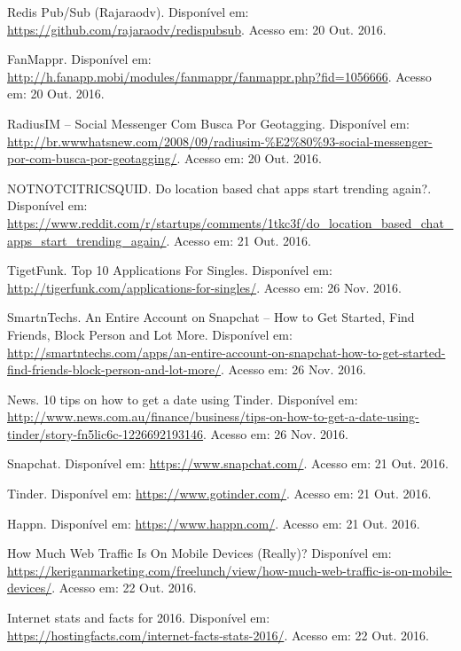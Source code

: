\documentclass[brazil,ruledheader]{abntifes}
\begin{document}
\begin{thebibliography}{9}
		Redis Pub/Sub (Rajaraodv). Disponível em: \url{https://github.com/rajaraodv/redispubsub}.
		Acesso em: 20 Out. 2016.
		
		FanMappr. Disponível em: \url{http://h.fanapp.mobi/modules/fanmappr/fanmappr.php?fid=1056666}.
		Acesso em: 20 Out. 2016.
		
		RadiusIM – Social Messenger Com Busca Por Geotagging. Disponível em: \url{http://br.wwwhatsnew.com/2008/09/radiusim-%E2%80%93-social-messenger-por-com-busca-por-geotagging/}.
			Acesso em: 20 Out. 2016.
			
		NOTNOTCITRICSQUID. Do location based chat apps start trending again?. Disponível em: \url{https://www.reddit.com/r/startups/comments/1tkc3f/do_location_based_chat_apps_start_trending_again/}.
		Acesso em: 21 Out. 2016.
		
		TigetFunk. Top 10 Applications For Singles. Disponível em: \url{http://tigerfunk.com/applications-for-singles/}.
		Acesso em: 26 Nov. 2016.
		
		SmartnTechs. An Entire Account on Snapchat – How to Get Started, Find Friends, Block Person and Lot More. Disponível em: \url{http://smartntechs.com/apps/an-entire-account-on-snapchat-how-to-get-started-find-friends-block-person-and-lot-more/}.
		Acesso em: 26 Nov. 2016.
		
		News. 10 tips on how to get a date using Tinder. Disponível em: \url{http://www.news.com.au/finance/business/tips-on-how-to-get-a-date-using-tinder/story-fn5lic6c-1226692193146}.
		Acesso em: 26 Nov. 2016.
		
		Snapchat. Disponível em: \url{https://www.snapchat.com/}.
		Acesso em: 21 Out. 2016.
		
		Tinder. Disponível em: \url{https://www.gotinder.com/}.
		Acesso em: 21 Out. 2016.
		
		Happn. Disponível em: \url{https://www.happn.com/}.
		Acesso em: 21 Out. 2016.
		
		How Much Web Traffic Is On Mobile Devices (Really)? Disponível em: \url{https://keriganmarketing.com/freelunch/view/how-much-web-traffic-is-on-mobile-devices/}.
		Acesso em: 22 Out. 2016.
		
		Internet stats and facts for 2016. Disponível em: \url{https://hostingfacts.com/internet-facts-stats-2016/}.
		Acesso em: 22 Out. 2016.
		

\end{thebibliography}
\end{document}
